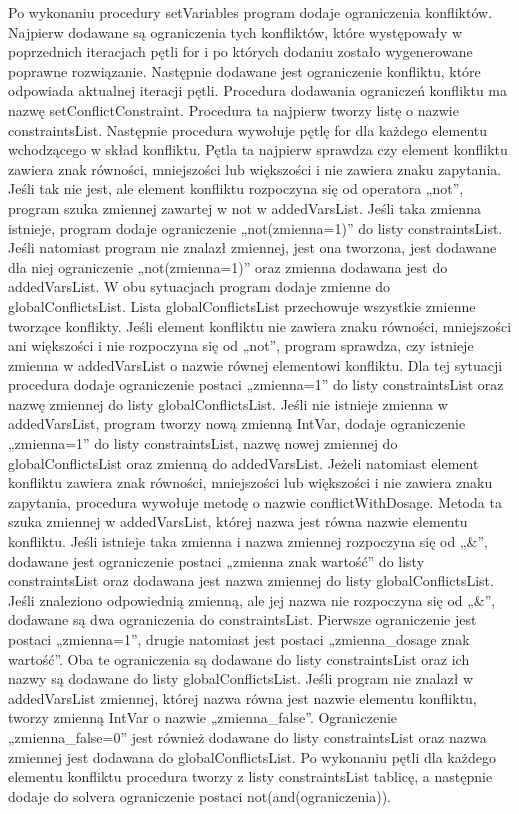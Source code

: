 Po wykonaniu procedury setVariables program dodaje ograniczenia konfliktów. Najpierw dodawane są ograniczenia tych konfliktów, które występowały w poprzednich iteracjach pętli for i po których dodaniu zostało wygenerowane poprawne rozwiązanie. Następnie dodawane jest ograniczenie konfliktu, które odpowiada aktualnej iteracji pętli. Procedura dodawania ograniczeń konfliktu ma nazwę setConflictConstraint. Procedura ta najpierw tworzy listę o nazwie constraintsList. Następnie procedura wywołuje pętlę for dla każdego elementu wchodzącego w skład konfliktu. Pętla ta najpierw sprawdza czy element konfliktu zawiera znak równości, mniejszości lub większości i nie zawiera znaku zapytania. Jeśli tak nie jest, ale element konfliktu rozpoczyna się od operatora „not”, program szuka zmiennej zawartej w not w addedVarsList. Jeśli taka zmienna istnieje, program dodaje ograniczenie „not(zmienna=1)” do listy constraintsList. Jeśli natomiast program nie znalazł zmiennej, jest ona tworzona, jest dodawane dla niej ograniczenie „not(zmienna=1)” oraz zmienna dodawana jest do addedVarsList. W obu sytuacjach program dodaje zmienne do globalConflictsList. Lista globalConflictsList przechowuje wszystkie zmienne tworzące konflikty. Jeśli element konfliktu nie zawiera znaku równości, mniejszości ani większości i nie rozpoczyna się od „not”, program sprawdza, czy istnieje zmienna w addedVarsList o nazwie równej elementowi konfliktu. Dla tej sytuacji procedura dodaje ograniczenie postaci „zmienna=1” do listy constraintsList oraz nazwę zmiennej do listy globalConflictsList. Jeśli nie istnieje zmienna w addedVarsList, program tworzy nową zmienną IntVar, dodaje ograniczenie „zmienna=1” do listy constraintsList, nazwę nowej zmiennej do globalConflictsList oraz zmienną do addedVarsList. Jeżeli natomiast element konfliktu zawiera znak równości, mniejszości lub większości i nie zawiera znaku zapytania, procedura wywołuje metodę o nazwie conflictWithDosage. Metoda ta szuka zmiennej w addedVarsList, której nazwa jest równa nazwie elementu konfliktu. Jeśli istnieje taka zmienna i nazwa zmiennej rozpoczyna się od „\&”, dodawane jest ograniczenie postaci „zmienna znak wartość” do listy constraintsList oraz dodawana jest nazwa zmiennej do listy globalConflictsList. Jeśli znaleziono odpowiednią zmienną, ale jej nazwa nie rozpoczyna się od „\&”, dodawane są dwa ograniczenia do constraintsList. Pierwsze ograniczenie jest postaci „zmienna=1”, drugie natomiast jest postaci „zmienna\_dosage znak wartość”. Oba te ograniczenia są dodawane do listy constraintsList oraz ich nazwy są dodawane do listy globalConflictsList. Jeśli program nie znalazł w addedVarsList zmiennej, której nazwa równa jest nazwie elementu konfliktu,  tworzy zmienną IntVar o nazwie „zmienna\_false”. Ograniczenie „zmienna\_false=0” jest również dodawane do listy constraintsList oraz nazwa zmiennej jest dodawana do globalConflictsList. Po wykonaniu pętli dla każdego elementu konfliktu procedura tworzy z listy constraintsList tablicę, a następnie dodaje do solvera ograniczenie postaci not(and(ograniczenia)). 

